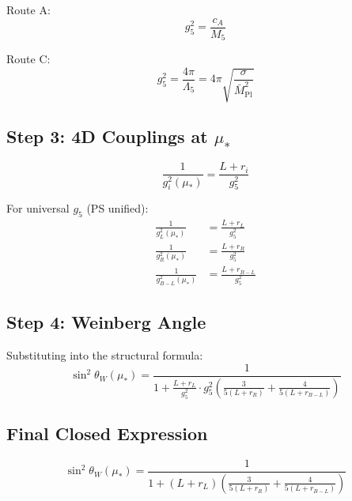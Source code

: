\documentclass[11pt,a4paper]{article}
\begin{document}
Route A:
\begin{equation}
\label{eq:g5-route-a}
g_5^2 = \frac{c_A}{M_5}
\end{equation}

Route C:
\begin{equation}
\label{eq:g5-route-c}
g_5^2 = \frac{4\pi}{\Lambda_5} = 4\pi \sqrt{\frac{\sigma}{\bar{M}_{\text{Pl}}^2}}
\end{equation}

\subsection{Step 3: 4D Couplings at $\mu_*$}
\label{subsec:step3}

\begin{equation}
\label{eq:g4-at-mustar}
\frac{1}{g_i^2(\mu_*)} = \frac{L + r_i}{g_5^2}
\end{equation}

For universal $g_5$ (PS unified):
\begin{align}
\label{eq:gL-closure}
\frac{1}{g_L^2(\mu_*)} &= \frac{L + r_L}{g_5^2} \\
\label{eq:gR-closure}
\frac{1}{g_R^2(\mu_*)} &= \frac{L + r_R}{g_5^2} \\
\label{eq:gBL-closure}
\frac{1}{g_{B-L}^2(\mu_*)} &= \frac{L + r_{B-L}}{g_5^2}
\end{align}

\subsection{Step 4: Weinberg Angle}
\label{subsec:step4}

Substituting into the structural formula:
\begin{equation}
\label{eq:sin2-closure-step}
\sin^2\theta_W(\mu_*) = \frac{1}{1 + \frac{L + r_L}{g_5^2} \cdot g_5^2 \left(\frac{3}{5(L+r_R)} + \frac{4}{5(L+r_{B-L})}\right)}
\end{equation}

\subsection{Final Closed Expression}
\label{subsec:final-expression}

\begin{equation}
\label{eq:sin2-final}
\boxed{\sin^2\theta_W(\mu_*) = \frac{1}{1 + (L + r_L)\left(\frac{3}{5(L+r_R)} + \frac{4}{5(L+r_{B-L})}\right)}}
\end{equation}
\end{document}
